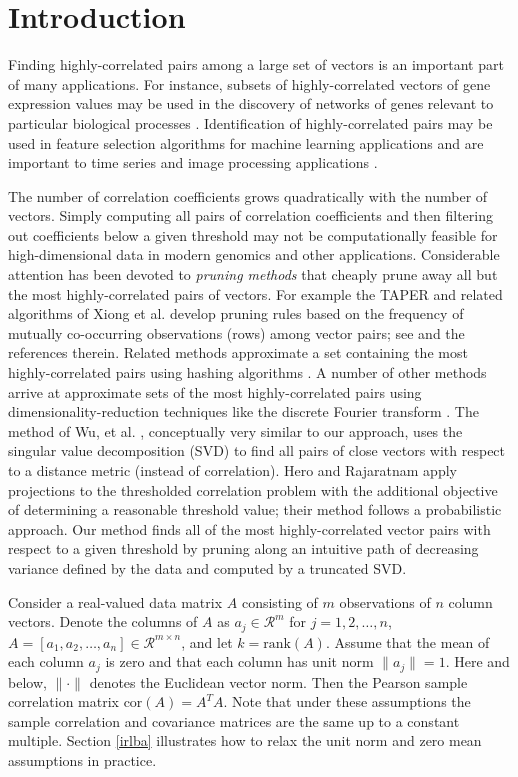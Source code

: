 \documentclass{article}
\numberwithin{algorithmctr}{section}
\begin{document}
\section{Introduction}\label{intro}

Finding highly-correlated pairs among a large set of vectors is an important
part of many applications. For instance, subsets of highly-correlated vectors
of gene expression values may be used in the discovery of networks of genes
relevant to particular biological processes \cite{genomics}.  Identification of
highly-correlated pairs may be used in feature selection algorithms for machine
learning applications \cite{ml1, ml2} and are important to time series and
image processing applications \cite{timeseries, svd-similarity}.

The number of correlation coefficients grows quadratically with the number of
vectors. Simply computing all pairs of correlation coefficients and then
filtering out coefficients below a given threshold may not be computationally
feasible for high-dimensional data in modern genomics and other applications.
Considerable attention has been devoted to \emph{pruning methods} that cheaply
prune away all but the most highly-correlated pairs of vectors.  For example
the TAPER and related algorithms of Xiong et al. develop pruning rules based on
the frequency of mutually co-occurring observations (rows) among vector pairs;
see \cite{prune1, prune2} and the references therein.  Related methods
approximate a set containing the most highly-correlated pairs using hashing
algorithms \cite{prune3}. A number of other methods arrive at approximate sets
of the most highly-correlated pairs using dimensionality-reduction techniques
like the discrete Fourier transform \cite{timeseries}. The method of Wu, et al.
\cite{svd-similarity}, conceptually very similar to our approach, uses the
singular value decomposition (SVD) to find all pairs of close vectors with
respect to a distance metric (instead of correlation). Hero and
Rajaratnam\cite{hero2011large} apply projections to the thresholded correlation
problem with the additional objective of determining a reasonable threshold
value; their method follows a probabilistic approach.  Our method finds all of
the most highly-correlated vector pairs with respect to a given threshold by
pruning along an intuitive path of decreasing variance defined by the data and
computed by a truncated SVD.

Consider a real-valued data matrix $A$ consisting of $m$ observations of $n$
column vectors.  Denote the columns of $A$ as $a_j\in\mathcal{R}^m$ for
$j=1,2,\ldots,n$, $A=[a_1, a_2, \ldots, a_n]\in\mathcal{R}^{m\times n}$, and
let $k=\mathrm{rank}(A)$.  Assume that the mean of each column $a_j$ is zero
and that each column has unit norm $\|a_j\| = 1$. Here and below, $\|\cdot\|$
denotes the Euclidean vector norm. Then the Pearson sample correlation matrix
$\mathrm{cor}(A)=A^TA$.  Note that under these assumptions the sample
correlation and covariance matrices are the same up to a constant multiple.
Section \ref{irlba} illustrates how to relax the unit norm and zero mean
assumptions in practice.
\end{document}
